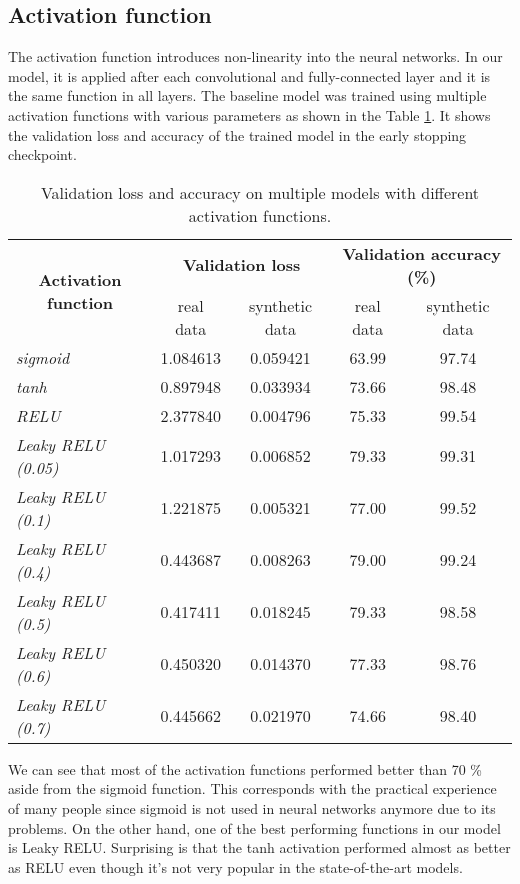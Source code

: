 \subsection{Activation function}

The activation function introduces non-linearity into the neural networks. In our model, it is applied after each convolutional and fully-connected layer and it is the same function in all layers. The baseline model was trained using multiple activation functions with various parameters as shown in the Table \ref{tab:actfuncs}. It shows the validation loss and accuracy of the trained model in the early stopping checkpoint. 

{\renewcommand{\arraystretch}{1.4}
\begin{table}[h]
\centering
\begin{tabular}{|l|cc|cc|}
\hline
\multicolumn{1}{|c|}{\multirow{2}{*}{\textbf{Activation function}}} & \multicolumn{2}{c|}{\textbf{Validation loss}} & \multicolumn{2}{c|}{\textbf{Validation accuracy (\%)}} \\ \cline{2-5} 
\multicolumn{1}{|c|}{} & \multicolumn{1}{c|}{real data} & synthetic data & \multicolumn{1}{c|}{real data} & synthetic data \\ \hline
\textit{sigmoid} & \multicolumn{1}{c|}{1.084613} & 0.059421 & \multicolumn{1}{c|}{63.99} & 97.74 \\ \hline
\textit{tanh} & \multicolumn{1}{c|}{0.897948} & 0.033934 & \multicolumn{1}{c|}{73.66} & 98.48 \\ \hline
\textit{RELU} & \multicolumn{1}{c|}{2.377840} & 0.004796 & \multicolumn{1}{c|}{75.33} & 99.54 \\ \hline
\textit{Leaky RELU (0.05)} & \multicolumn{1}{c|}{1.017293} & 0.006852 & \multicolumn{1}{c|}{79.33} & 99.31 \\ \hline
\textit{Leaky RELU (0.1)} & \multicolumn{1}{c|}{1.221875} & 0.005321 & \multicolumn{1}{c|}{77.00} & 99.52 \\ \hline
\textit{Leaky RELU (0.4)} & \multicolumn{1}{c|}{0.443687} & 0.008263 & \multicolumn{1}{c|}{79.00} & 99.24 \\ \hline
\textit{Leaky RELU (0.5)} & \multicolumn{1}{c|}{0.417411} & 0.018245 & \multicolumn{1}{c|}{79.33} & 98.58 \\ \hline
\textit{Leaky RELU (0.6)} & \multicolumn{1}{c|}{0.450320} & 0.014370 & \multicolumn{1}{c|}{77.33} & 98.76 \\ \hline
\textit{Leaky RELU (0.7)} & \multicolumn{1}{c|}{0.445662} & 0.021970 & \multicolumn{1}{c|}{74.66} & 98.40 \\ \hline
\end{tabular}
\caption{Validation loss and accuracy on multiple models with different activation functions.}
\label{tab:actfuncs}
\end{table}}


We can see that most of the activation functions performed better than 70 \% aside from the sigmoid function. This corresponds with the practical experience of many people since sigmoid is not used in neural networks anymore due to its problems. On the other hand, one of the best performing functions in our model is Leaky RELU. Surprising is that the tanh activation performed almost as better as RELU even though it's not very popular in the state-of-the-art models. 
